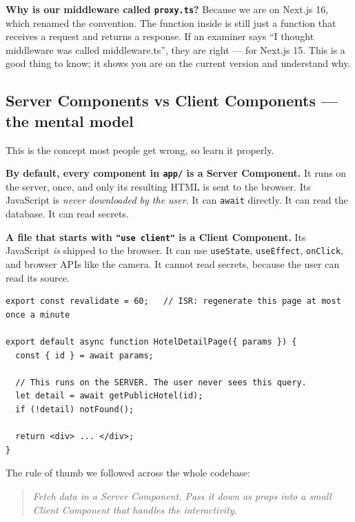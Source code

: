 \documentclass[11pt,a4paper]{article}
\newcommand{\file}[1]{\texttt{\small #1}}
\begin{document}
\begin{notebox}
\textbf{Why is our middleware called \file{proxy.ts}?} Because we are on Next.js
16, which renamed the convention. The function inside is still just a function
that receives a request and returns a response. If an examiner says ``I thought
middleware was called middleware.ts'', they are right --- for Next.js 15. This is
a good thing to know; it shows you are on the current version and understand why.
\end{notebox}

\subsection{Server Components vs Client Components --- the mental model}

This is the concept most people get wrong, so learn it properly.

\textbf{By default, every component in \file{app/} is a Server Component.} It
runs on the server, once, and only its resulting HTML is sent to the browser.
Its JavaScript is \emph{never downloaded by the user}. It can \texttt{await}
directly. It can read the database. It can read secrets.

\textbf{A file that starts with \texttt{"use client"} is a Client Component.}
Its JavaScript \emph{is} shipped to the browser. It can use \texttt{useState},
\texttt{useEffect}, \texttt{onClick}, and browser APIs like the camera. It
cannot read secrets, because the user can read its source.

\begin{lstlisting}[language=TS,caption={app/hotels/[id]/page.tsx --- a Server Component. Note: no "use client", and it awaits a database read directly.}]
export const revalidate = 60;   // ISR: regenerate this page at most once a minute

export default async function HotelDetailPage({ params }) {
  const { id } = await params;

  // This runs on the SERVER. The user never sees this query.
  let detail = await getPublicHotel(id);
  if (!detail) notFound();

  return <div> ... </div>;
}
\end{lstlisting}

The rule of thumb we followed across the whole codebase:

\begin{quote}
\emph{Fetch data in a Server Component. Pass it down as props into a small
Client Component that handles the interactivity.}
\end{quote}
\end{document}
